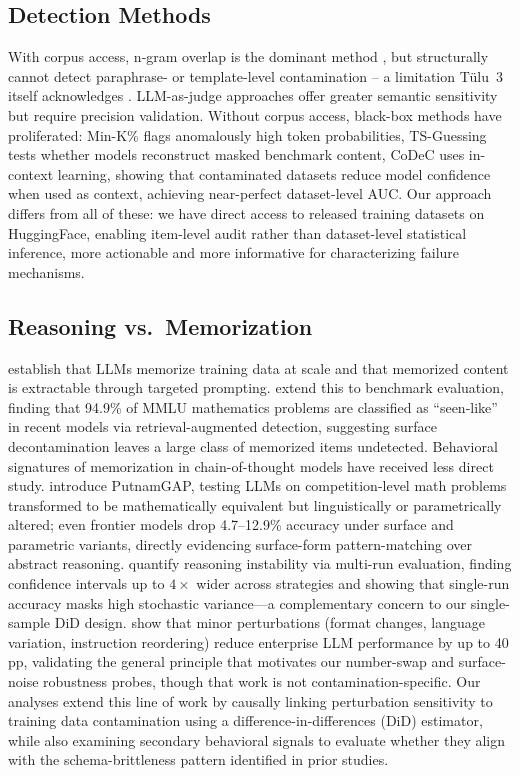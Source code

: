 \documentclass{article} %
\begin{document}
\subsection{Detection Methods}

With corpus access, n-gram overlap is the dominant method \citep{brown2020gpt3}, but structurally cannot detect paraphrase- or template-level contamination -- a limitation T\"ulu~3 itself acknowledges \citep{lambert2025tulu3}. LLM-as-judge approaches \citep{yang2023rethinking, deng2024investigating} offer greater semantic sensitivity but require precision validation. Without corpus access, black-box methods have proliferated: Min-K\% \citep{shi2023detecting} flags anomalously high token probabilities, TS-Guessing \citep{deng2024investigating} tests whether models reconstruct masked benchmark content, CoDeC \citep{zawalski2025codec} uses in-context learning, showing that contaminated datasets reduce model confidence when used as context, achieving near-perfect dataset-level AUC. Our approach differs from all of these: we have direct access to released training datasets on HuggingFace, enabling item-level audit rather than dataset-level statistical inference, more actionable and more informative for characterizing failure mechanisms.

\subsection{Reasoning vs.\ Memorization}

\citet{carlini2021extracting} establish that LLMs memorize training data at scale and that memorized content is extractable through targeted prompting. \citet{memlens2025} extend this to benchmark evaluation, finding that 94.9\% of MMLU mathematics problems are classified as ``seen-like'' in recent models via retrieval-augmented detection, suggesting surface decontamination leaves a large class of memorized items undetected. Behavioral signatures of memorization in chain-of-thought models have received less direct study. \citet{hao2025putnamgap} introduce PutnamGAP, testing LLMs on competition-level math problems transformed to be mathematically equivalent but linguistically or parametrically altered; even frontier models drop 4.7--12.9\% accuracy under surface and parametric variants, directly evidencing surface-form pattern-matching over abstract reasoning. \citet{potamitis2025reasonbench} quantify reasoning instability via multi-run evaluation, finding confidence intervals up to $4\times$ wider across strategies and showing that single-run accuracy masks high stochastic variance---a complementary concern to our single-sample DiD design. \citet{bogavelli2026perturbation} show that minor perturbations (format changes, language variation, instruction reordering) reduce enterprise LLM performance by up to 40\,pp, validating the general principle that motivates our number-swap and surface-noise robustness probes, though that work is not contamination-specific. Our analyses extend this line of work by causally linking perturbation sensitivity to training data contamination using a difference-in-differences (DiD) estimator, while also examining secondary behavioral signals to evaluate whether they align with the schema-brittleness pattern identified in prior studies.
\end{document}
